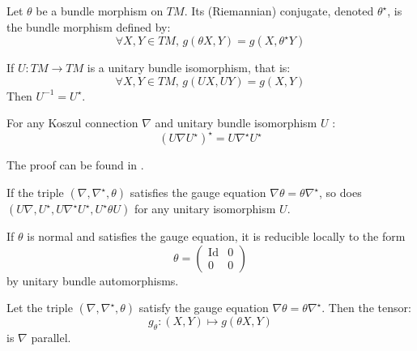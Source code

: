 \begin{defn}
\label{def:endo_conjugate}
Let $\theta$ be a bundle morphism on $TM.$ Its (Riemannian) conjugate,
denoted $\theta^\star$, is the bundle morphism defined by:
\begin{equation}
    \label{eq:endo_conjugate}
    \forall X,Y \in TM, \, g\left( \theta X, Y\right) = 
    g\left( X, \theta^\star Y\right)
\end{equation}
\end{defn}
\begin{prop}
\label{prop:inverse_unitary}
If $U \colon TM \to TM$ is a unitary bundle isomorphism, that is:
\[
\forall X,Y \in TM, \, g\left( UX, UY \right) = g(X,Y)
\]
Then $U^{-1} = U^\star.$
\end{prop}

\begin{prop}
\label{prop:unitary_conjugate}
For any Koszul connection $\nabla$ and unitary bundle isomorphism $U$ :
\begin{equation}
\label{eq:unitary_conjugate}
\left(U \nabla U^\star\right)^\star = U \nabla^\star U^\star
\end{equation}
\end{prop}
The proof can be found in \cite{boyom2024}.
\begin{prop}
\label{prop:unitary_conjugate_gauge}
If the triple $\left(\nabla,\nabla^\star,\theta \right)$ satisfies the gauge equation $\nabla \theta = \theta \nabla^\star$, so does  $\left(U \nabla, U^\star, U \nabla^\star U^\star, U^\star \theta U\right)$ for any unitary isomorphism $U.$
\end{prop}
\begin{rem}
If $\theta$ is normal and satisfies the gauge equation, it is reducible locally to the form
\begin{equation}
    \label{eq:reduced_normal_theta}
    \theta = \left( \begin{array}{c|c} \text{Id} & 0 \\ \hline
    0 & 0
    \end{array} \right)
\end{equation}
by unitary bundle automorphisms.
\end{rem}
\begin{prop}
\label{prop:parallel_g_tensor}
Let the triple $\left(\nabla,\nabla^\star,\theta \right)$ satisfy the gauge equation $\nabla \theta = \theta \nabla^\star.$ Then the tensor:
\begin{equation}
    \label{eq:parallel_g_tensor}
    g_\theta \colon (X,Y) \mapsto g\left( \theta X, Y\right)
\end{equation}
is $\nabla$ parallel.
\end{prop}


